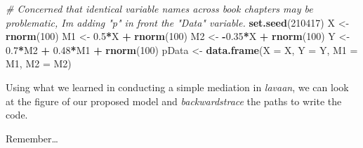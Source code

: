 \documentclass[
  11pt,
]{book}
\newenvironment{Shaded}{\begin{snugshade}}{\end{snugshade}}
\newcommand{\AttributeTok}[1]{\textcolor[rgb]{0.27,0.27,0.27}{#1}}
\newcommand{\CommentTok}[1]{\textcolor[rgb]{0.37,0.37,0.37}{\textit{#1}}}
\newcommand{\DecValTok}[1]{\textcolor[rgb]{0.06,0.06,0.06}{#1}}
\newcommand{\FloatTok}[1]{\textcolor[rgb]{0.06,0.06,0.06}{#1}}
\newcommand{\FunctionTok}[1]{\textcolor[rgb]{0.27,0.27,0.27}{\textbf{#1}}}
\newcommand{\NormalTok}[1]{#1}
\newcommand{\OtherTok}[1]{\textcolor[rgb]{0.37,0.37,0.37}{#1}}
\newcommand{\SpecialCharTok}[1]{\textcolor[rgb]{0.43,0.43,0.43}{\textbf{#1}}}
\begin{document}
\begin{Shaded}
\begin{Highlighting}[]
\CommentTok{\# Concerned that identical variable names across book chapters may be problematic, I\textquotesingle{}m adding "p" in front the "Data" variable.}
\FunctionTok{set.seed}\NormalTok{(}\DecValTok{210417}\NormalTok{)}
\NormalTok{X }\OtherTok{\textless{}{-}} \FunctionTok{rnorm}\NormalTok{(}\DecValTok{100}\NormalTok{)}
\NormalTok{M1 }\OtherTok{\textless{}{-}} \FloatTok{0.5}\SpecialCharTok{*}\NormalTok{X }\SpecialCharTok{+} \FunctionTok{rnorm}\NormalTok{(}\DecValTok{100}\NormalTok{)}
\NormalTok{M2 }\OtherTok{\textless{}{-}} \SpecialCharTok{{-}}\FloatTok{0.35}\SpecialCharTok{*}\NormalTok{X }\SpecialCharTok{+} \FunctionTok{rnorm}\NormalTok{(}\DecValTok{100}\NormalTok{)}
\NormalTok{Y }\OtherTok{\textless{}{-}} \FloatTok{0.7}\SpecialCharTok{*}\NormalTok{M2 }\SpecialCharTok{+} \FloatTok{0.48}\SpecialCharTok{*}\NormalTok{M1 }\SpecialCharTok{+} \FunctionTok{rnorm}\NormalTok{(}\DecValTok{100}\NormalTok{)}
\NormalTok{pData }\OtherTok{\textless{}{-}} \FunctionTok{data.frame}\NormalTok{(}\AttributeTok{X =}\NormalTok{ X, }\AttributeTok{Y =}\NormalTok{ Y, }\AttributeTok{M1 =}\NormalTok{ M1, }\AttributeTok{M2 =}\NormalTok{ M2)}
\end{Highlighting}
\end{Shaded}

Using what we learned in conducting a simple mediation in \emph{lavaan}, we can look at the figure of our proposed model and \emph{backwardstrace} the paths to write the code.

Remember\ldots{}
\end{document}

